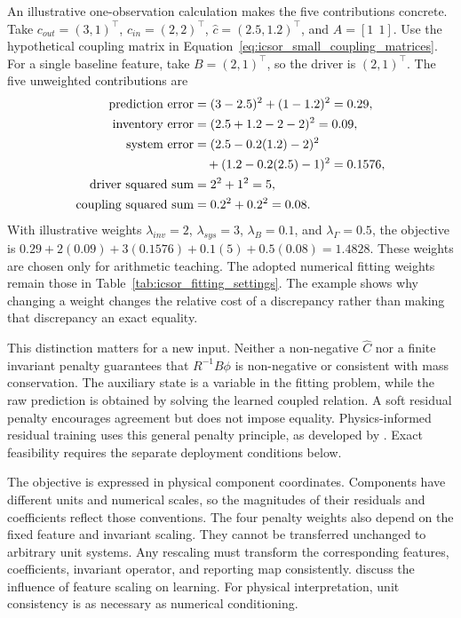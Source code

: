 An illustrative one-observation calculation makes the five contributions concrete. Take \(c_{out}=(3,1)^\top\), \(c_{in}=(2,2)^\top\), \(\widehat c=(2.5,1.2)^\top\), and \(A=[1\ \ 1]\). Use the hypothetical coupling matrix in Equation~\eqref{eq:icsor_small_coupling_matrices}. For a single baseline feature, take \(B=(2,1)^\top\), so the driver is \((2,1)^\top\). The five unweighted contributions are
\begin{equation}
\equationname{Illustrative numerical contributions to the training penalties}
\label{eq:icsor_penalty_numbers}
\begin{aligned}
\text{prediction error}&=(3-2.5)^2+(1-1.2)^2=0.29,\\
\text{inventory error}&=(2.5+1.2-2-2)^2=0.09,\\
\text{system error}&=(2.5-0.2(1.2)-2)^2\\
&\quad +(1.2-0.2(2.5)-1)^2=0.1576,\\
\text{driver squared sum}&=2^2+1^2=5,\\
\text{coupling squared sum}&=0.2^2+0.2^2=0.08.
\end{aligned}
\end{equation}
With illustrative weights \(\lambda_{inv}=2\), \(\lambda_{sys}=3\), \(\lambda_B=0.1\), and \(\lambda_{\Gamma}=0.5\), the objective is \(0.29+2(0.09)+3(0.1576)+0.1(5)+0.5(0.08)=1.4828\). These weights are chosen only for arithmetic teaching. The adopted numerical fitting weights remain those in Table~\ref{tab:icsor_fitting_settings}. The example shows why changing a weight changes the relative cost of a discrepancy rather than making that discrepancy an exact equality.

This distinction matters for a new input. Neither a non-negative \(\widehat C\) nor a finite invariant penalty guarantees that \(R^{-1}B\phi\) is non-negative or consistent with mass conservation. The auxiliary state is a variable in the fitting problem, while the raw prediction is obtained by solving the learned coupled relation. A soft residual penalty encourages agreement but does not impose equality. Physics-informed residual training uses this general penalty principle, as developed by \citet{Raissi2019}. Exact feasibility requires the separate deployment conditions below.

The objective is expressed in physical component coordinates. Components have different units and numerical scales, so the magnitudes of their residuals and coefficients reflect those conventions. The four penalty weights also depend on the fixed feature and invariant scaling. They cannot be transferred unchanged to arbitrary unit systems. Any rescaling must transform the corresponding features, coefficients, invariant operator, and reporting map consistently. \citet{Pinheiro2025} discuss the influence of feature scaling on learning. For physical interpretation, unit consistency is as necessary as numerical conditioning.

